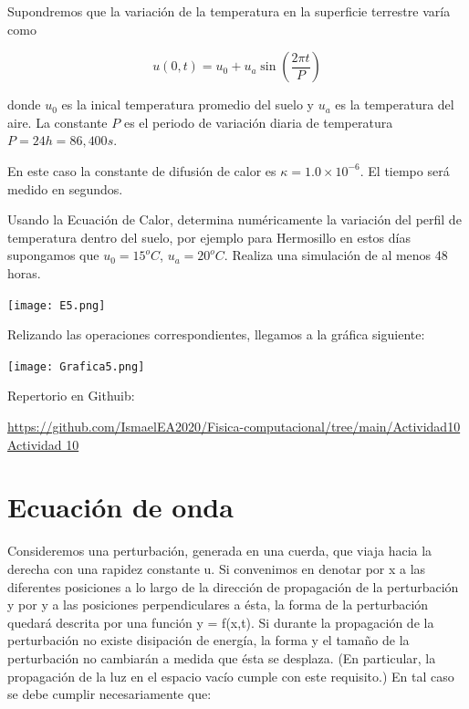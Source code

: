 \documentclass[12pt]{article}
\begin{document}
Supondremos que la variación de la temperatura en la superficie terrestre varía como 

\begin{equation*}
u(0,t) = u_0 + u_a \sin (\frac{2\pi t}{P})
\end{equation*}

donde $u_0$ es la inical temperatura promedio del suelo y $u_a$ es la temperatura del aire. La constante $P$ es el periodo de variación diaria de temperatura $P=24 h=86,400 s$.

En este caso la constante de difusión de calor es $\kappa = 1.0 \times 10^{-6}$. El tiempo será medido en segundos. 

Usando la Ecuación de Calor, determina numéricamente  la variación del perfil de temperatura dentro del suelo, por ejemplo para Hermosillo en estos días supongamos que $u_0=15^{o}C$, $u_a= 20^{o}C$. Realiza una simulación de al menos 48 horas. 

\begin{center}
    \texttt{[image: E5.png]}
\end{center}

Relizando las operaciones correspondientes, llegamos a la gráfica siguiente:

\begin{center}
    \texttt{[image: Grafica5.png]}
\end{center}

\begin{center}
    Repertorio en Githuib:
    
    \url{https://github.com/IsmaelEA2020/Fisica-computacional/tree/main/Actividad10}
\href{http://www.latex-project.org/}{Actividad 10}

\end{center}






\section{Ecuación de onda}

Consideremos una perturbación, generada en una cuerda, que viaja hacia
la derecha con una rapidez constante u. Si convenimos en denotar por x
a las diferentes posiciones a lo largo de la dirección de propagación de la
perturbación y por y a las posiciones perpendiculares a ésta, la forma de la
perturbación quedará descrita por una función y = f(x,t). Si durante la propagación
de la perturbación no existe disipación de energía, la forma y el tamaño de la
perturbación no cambiarán a medida que ésta se desplaza. (En particular, la
propagación de la luz en el espacio vacío cumple con este requisito.) En tal caso
se debe cumplir necesariamente que:
\end{document}
